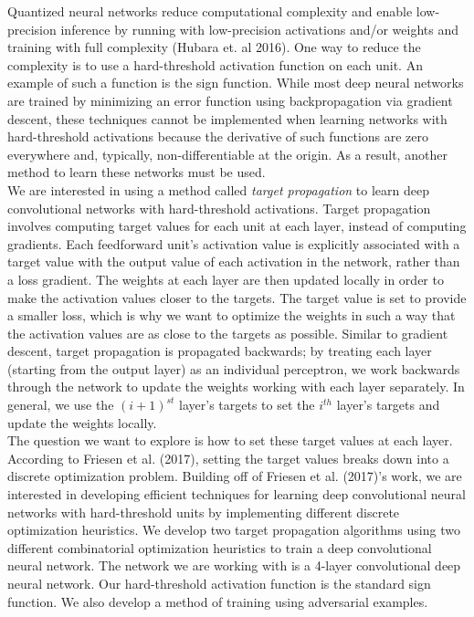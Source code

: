 Quantized neural networks reduce computational complexity and enable low-precision inference by running with low-precision activations and/or weights and training with full complexity (Hubara et. al 2016). One way to reduce the complexity is to use a hard-threshold activation function on each unit. An example of such a function is the sign function. While most deep neural networks are trained by minimizing an error function using backpropagation via gradient descent, these techniques cannot be implemented when learning networks with hard-threshold activations because the derivative of such functions are zero everywhere and, typically, non-differentiable at the origin. As a result, another method to learn these networks must be used. \\ 

We are interested in using a method called \emph{target propagation} to learn deep convolutional networks with hard-threshold activations. Target propagation involves computing target values for each unit at each layer, instead of computing gradients. Each feedforward unit's activation value is explicitly associated with a target value with the output value of each activation in the network, rather than a loss gradient. The weights at each layer are then updated locally in order to make the activation values closer to the targets. The target value is set to provide a smaller loss, which is why we want to optimize the weights in such a way that the activation values are as close to the targets as possible. Similar to gradient descent, target propagation is propagated backwards; by treating each layer (starting from the output layer) as an individual perceptron, we work backwards through the network to update the weights working with each layer separately. In general, we use the $(i+1)^{st}$ layer's targets to set the $i^{th}$ layer's targets and update the weights locally. \\

The question we want to explore is how to set these target values at each layer. According to Friesen et al. (2017), setting the target values breaks down into a discrete optimization problem. Building off of Friesen et al. (2017)'s work, we are interested in developing efficient techniques for learning deep convolutional neural networks with hard-threshold units by implementing different discrete optimization heuristics. We develop two target propagation algorithms using two different combinatorial optimization heuristics  to train a deep convolutional neural network. The network we are working with is a 4-layer convolutional deep neural network. Our hard-threshold activation function is the standard sign function. We also develop a method of training using adversarial examples. 



